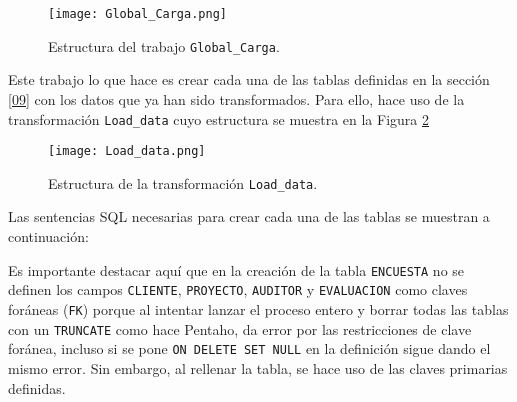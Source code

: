 \begin{figure}[!th]
\texttt{[image: Global\_Carga.png]}
\centering
\caption{Estructura del trabajo \texttt{Global\_Carga}.}
\label{Global_Carga}
\end{figure}

\newpage
Este trabajo lo que hace es crear cada una de las tablas definidas en la sección \ref{09} con los datos que ya han sido transformados. Para ello, hace uso de la transformación \texttt{Load\_data} cuyo estructura se muestra en la Figura \ref{Load_data}


\begin{figure}[!th]
\texttt{[image: Load\_data.png]}
\centering
\caption{Estructura de la transformación \texttt{Load\_data}.}
\label{Load_data}
\end{figure}

Las sentencias SQL necesarias para crear cada una de las tablas se muestran a continuación:


Es importante destacar aquí que en la creación de la tabla \texttt{ENCUESTA} no se definen los campos \texttt{CLIENTE}, \texttt{PROYECTO}, \texttt{AUDITOR} y \texttt{EVALUACION} como claves foráneas (\texttt{FK}) porque al intentar lanzar el proceso entero y borrar todas las tablas con un \texttt{TRUNCATE} como hace Pentaho, da error por las restricciones de clave foránea, incluso si se pone \texttt{ON DELETE SET NULL} en la definición sigue dando el mismo error. Sin embargo, al rellenar la tabla, se hace uso de las claves primarias definidas.

